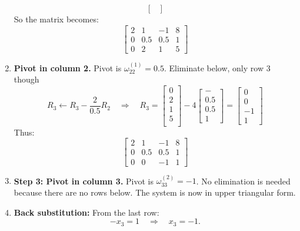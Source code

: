 \documentclass[../../../main.tex]{subfiles}
\begin{document}
\begin{enumerate}
\begin{equation*}
\begin{bmatrix}
              \end{bmatrix}
          \end{equation*}
          So the matrix becomes:
          \begin{equation*}
              \begin{bmatrix}
                  2 & 1   & -1  & 8 \\
                  0 & 0.5 & 0.5 & 1 \\
                  0 & 2   & 1   & 5
              \end{bmatrix}
          \end{equation*}
    \item \textbf{Pivot in column 2.}
          Pivot is $\omega_{22}^{(1)} = 0.5$.
          Eliminate below, only row 3 though
          \begin{equation*}
              R_3 \leftarrow R_3 - \frac{2}{0.5} R_2 \quad \Rightarrow \quad
              R_3=
              \begin{bmatrix}
                  0 \\2\\1\\5\\
              \end{bmatrix}
              -4
              \begin{bmatrix}
                  - \\0.5\\0.5\\1
              \end{bmatrix}
              =
              \begin{bmatrix}
                  0 \\0\\-1\\1
              \end{bmatrix}
          \end{equation*}
          Thus:
          \begin{equation*}
              \begin{bmatrix}
                  2 & 1   & -1  & 8 \\
                  0 & 0.5 & 0.5 & 1 \\
                  0 & 0   & -1  & 1
              \end{bmatrix}
          \end{equation*}

    \item \textbf{Step 3: Pivot in column 3.}
          Pivot is $\omega_{33}^{(2)} = -1$. No elimination is needed because there are no rows below.
          The system is now in upper triangular form.
    \item \textbf{Back substitution:}
          From the last row:
          \begin{equation*}
              - x_3 = 1 \quad \Rightarrow \quad x_3 = -1.
          \end{equation*}


\end{enumerate}
\end{document}
